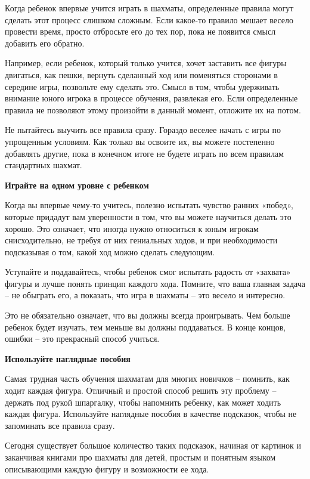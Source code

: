 Когда ребенок впервые учится играть в шахматы, определенные правила могут сделать этот процесс слишком сложным. Если какое-то правило мешает весело провести время, просто отбросьте его до тех пор, пока не появится смысл добавить его обратно.

Например, если ребенок, который только учится, хочет заставить все фигуры двигаться, как пешки, вернуть сделанный ход или поменяться сторонами в середине игры, позвольте ему сделать это. Смысл в том, чтобы удерживать внимание юного игрока в процессе обучения, развлекая его. Если определенные правила не позволяют этому произойти в данный момент, отложите их на потом.

Не пытайтесь выучить все правила сразу. Гораздо веселее начать с игры по упрощенным условиям. Как только вы освоите их, вы можете постепенно добавлять другие, пока в конечном итоге не будете играть по всем правилам стандартных шахмат.

\textbf{Играйте на одном уровне с ребенком}

Когда вы впервые чему-то учитесь, полезно испытать чувство ранних «побед», которые придадут вам уверенности в том, что вы можете научиться делать это хорошо. Это означает, что иногда нужно относиться к юным игрокам снисходительно, не требуя от них гениальных ходов, и при необходимости подсказывая о том, какой ход можно сделать следующим.

Уступайте и поддавайтесь, чтобы ребенок смог испытать радость от «захвата» фигуры и лучше понять принцип каждого хода. Помните, что ваша главная задача – не обыграть его, а показать, что игра в шахматы – это весело и интересно.

Это не обязательно означает, что вы должны всегда проигрывать. Чем больше ребенок будет изучать, тем меньше вы должны поддаваться. В конце концов, ошибки – это прекрасный способ учиться.

\textbf{Используйте наглядные пособия}

Самая трудная часть обучения шахматам для многих новичков – помнить, как ходит каждая фигура. Отличный и простой способ решить эту проблему – держать под рукой шпаргалку, чтобы напомнить ребенку, как может ходить каждая фигура. Используйте наглядные пособия в качестве подсказок, чтобы не запоминать все правила сразу.

Сегодня существует большое количество таких подсказок, начиная от картинок и заканчивая книгами про шахматы для детей, простым и понятным языком описывающими каждую фигуру и возможности ее хода.

